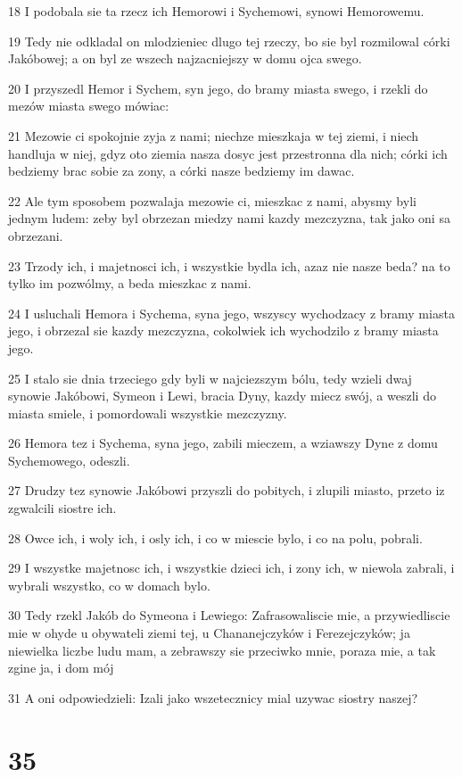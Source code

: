 \par 18 I podobala sie ta rzecz ich Hemorowi i Sychemowi, synowi Hemorowemu.
\par 19 Tedy nie odkladal on mlodzieniec dlugo tej rzeczy, bo sie byl rozmilowal córki Jakóbowej; a on byl ze wszech najzacniejszy w domu ojca swego.
\par 20 I przyszedl Hemor i Sychem, syn jego, do bramy miasta swego, i rzekli do mezów miasta swego mówiac:
\par 21 Mezowie ci spokojnie zyja z nami; niechze mieszkaja w tej ziemi, i niech handluja w niej, gdyz oto ziemia nasza dosyc jest przestronna dla nich; córki ich bedziemy brac sobie za zony, a córki nasze bedziemy im dawac.
\par 22 Ale tym sposobem pozwalaja mezowie ci, mieszkac z nami, abysmy byli jednym ludem: zeby byl obrzezan miedzy nami kazdy mezczyzna, tak jako oni sa obrzezani.
\par 23 Trzody ich, i majetnosci ich, i wszystkie bydla ich, azaz nie nasze beda? na to tylko im pozwólmy, a beda mieszkac z nami.
\par 24 I usluchali Hemora i Sychema, syna jego, wszyscy wychodzacy z bramy miasta jego, i obrzezal sie kazdy mezczyzna, cokolwiek ich wychodzilo z bramy miasta jego.
\par 25 I stalo sie dnia trzeciego gdy byli w najciezszym bólu, tedy wzieli dwaj synowie Jakóbowi, Symeon i Lewi, bracia Dyny, kazdy miecz swój, a weszli do miasta smiele, i pomordowali wszystkie mezczyzny.
\par 26 Hemora tez i Sychema, syna jego, zabili mieczem, a wziawszy Dyne z domu Sychemowego, odeszli.
\par 27 Drudzy tez synowie Jakóbowi przyszli do pobitych, i zlupili miasto, przeto iz zgwalcili siostre ich.
\par 28 Owce ich, i woly ich, i osly ich, i co w miescie bylo, i co na polu, pobrali.
\par 29 I wszystke majetnosc ich, i wszystkie dzieci ich, i zony ich, w niewola zabrali, i wybrali wszystko, co w domach bylo.
\par 30 Tedy rzekl Jakób do Symeona i Lewiego: Zafrasowaliscie mie, a przywiedliscie mie w ohyde u obywateli ziemi tej, u Chananejczyków i Ferezejczyków; ja niewielka liczbe ludu mam, a zebrawszy sie przeciwko mnie, poraza mie, a tak zgine ja, i dom mój
\par 31 A oni odpowiedzieli: Izali jako wszetecznicy mial uzywac siostry naszej?

\chapter{35}

